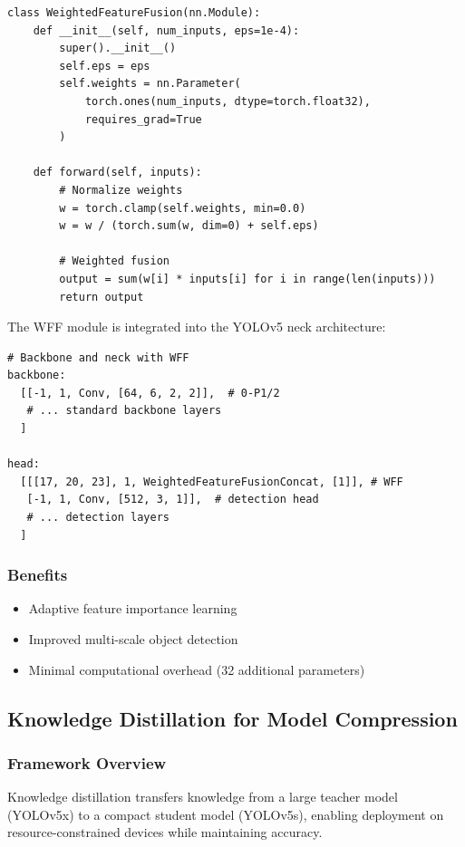\documentclass[journal]{IEEEtran}
\begin{document}
\begin{lstlisting}[caption=Weighted Feature Fusion Module]
class WeightedFeatureFusion(nn.Module):
    def __init__(self, num_inputs, eps=1e-4):
        super().__init__()
        self.eps = eps
        self.weights = nn.Parameter(
            torch.ones(num_inputs, dtype=torch.float32), 
            requires_grad=True
        )
    
    def forward(self, inputs):
        # Normalize weights
        w = torch.clamp(self.weights, min=0.0)
        w = w / (torch.sum(w, dim=0) + self.eps)
        
        # Weighted fusion
        output = sum(w[i] * inputs[i] for i in range(len(inputs)))
        return output
\end{lstlisting}

The WFF module is integrated into the YOLOv5 neck architecture:

\begin{lstlisting}[caption=YOLOv5s-WFF Configuration]
# Backbone and neck with WFF
backbone:
  [[-1, 1, Conv, [64, 6, 2, 2]],  # 0-P1/2
   # ... standard backbone layers
  ]

head:
  [[[17, 20, 23], 1, WeightedFeatureFusionConcat, [1]], # WFF
   [-1, 1, Conv, [512, 3, 1]],  # detection head
   # ... detection layers
  ]
\end{lstlisting}

\subsubsection{Benefits}

\begin{itemize}
\item Adaptive feature importance learning
\item Improved multi-scale object detection
\item Minimal computational overhead (32 additional parameters)
\end{itemize}

\subsection{Knowledge Distillation for Model Compression}

\subsubsection{Framework Overview}

Knowledge distillation transfers knowledge from a large teacher model (YOLOv5x) to a compact student model (YOLOv5s), enabling deployment on resource-constrained devices while maintaining accuracy.
\end{document}
